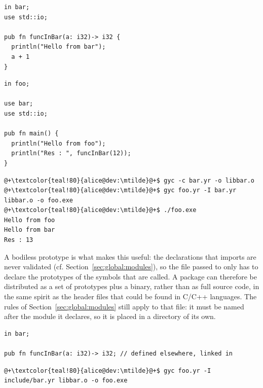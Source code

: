 \begin{minipage}[t][][t]{0.47\linewidth}
\begin{lstlisting}[caption=\textit{./bar.yr}, style=coloredverbatim]
in bar;
use std::io;

pub fn funcInBar(a: i32)-> i32 {
  println("Hello from bar");
  a + 1
}
\end{lstlisting}
\end{minipage}\hspace{5pt}%
\begin{minipage}[t][][t]{0.47\linewidth}
\begin{lstlisting}[caption=\textit{./foo.yr}, style=coloredverbatim]
in foo;

use bar;
use std::io;

pub fn main() {
  println("Hello from foo");
  println("Res : ", funcInBar(12));
}
\end{lstlisting}
\end{minipage}

\begin{lstlisting}[style=bashVerb, escapechar=@+]
@+\textcolor{teal!80}{alice@dev:\mtilde}@+$ gyc -c bar.yr -o libbar.o
@+\textcolor{teal!80}{alice@dev:\mtilde}@+$ gyc foo.yr -I bar.yr libbar.o -o foo.exe
@+\textcolor{teal!80}{alice@dev:\mtilde}@+$ ./foo.exe
Hello from foo
Hello from bar
Res : 13
\end{lstlisting}

A bodiless prototype is what makes this useful: the declarations that 
imports are never validated (cf. Section~\ref{sec:global:modules}), so the file passed
to  only has to declare the prototypes of the symbols that are called.
A package can therefore be distributed as a set of prototypes plus a binary,
rather than as full source code, in the same spirit as the header files that
could be found in C/C++ languages. The rules of Section~\ref{sec:global:modules} still
apply to that file: it must be named after the module it declares, so it is
placed in a directory of its own.

\begin{lstlisting}[caption=\textit{./include/bar.yr}, style=coloredverbatim]
in bar;

pub fn funcInBar(a: i32)-> i32; // defined elsewhere, linked in
\end{lstlisting}

\begin{lstlisting}[style=bashVerb, escapechar=@+]
@+\textcolor{teal!80}{alice@dev:\mtilde}@+$ gyc foo.yr -I include/bar.yr libbar.o -o foo.exe
\end{lstlisting}

